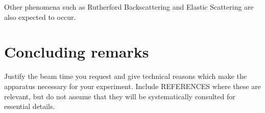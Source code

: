\documentclass{article}
\begin{document}
\begin{multicols}{2}
Other phenomena such as Rutherford Backscattering and Elastic Scattering are also expected to occur.

\section{Concluding remarks}

Justify the beam time you request and give technical reasons which make the apparatus necessary for your experiment.
Include REFERENCES where these are relevant, but do not assume that they will be systematically consulted for essential
details.

\printbibliography
\nocite{*}

\end{multicols}
\end{document}
